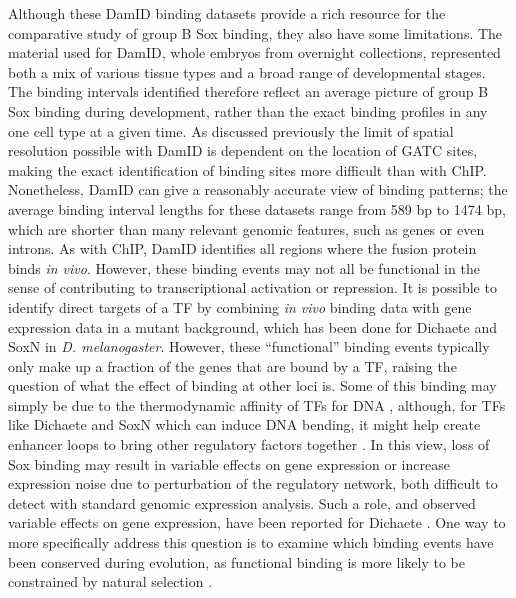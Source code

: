Although these DamID binding datasets provide a rich resource for the comparative study of group B Sox binding, they also have some limitations. The material used for DamID, whole embryos from overnight collections, represented both a mix of various tissue types and a broad range of developmental stages. The binding intervals identified therefore reflect an average picture of group B Sox binding during development, rather than the exact binding profiles in any one cell type at a given time. As discussed previously the limit of spatial resolution possible with DamID is dependent on the location of GATC sites, making the exact identification of binding sites more difficult than with ChIP. Nonetheless, DamID can give a reasonably accurate view of binding patterns; the average binding interval lengths for these datasets range from 589 bp to 1474 bp, which are shorter than many relevant genomic features, such as genes or even introns. As with ChIP, DamID identifies all regions where the fusion protein binds \emph{in vivo}. However, these binding events may not all be functional in the sense of contributing to transcriptional activation or repression. It is possible to identify direct targets of a TF by combining \emph{in vivo} binding data with gene expression data in a mutant background, which has been done for Dichaete and SoxN in \emph{D. melanogaster}. However, these “functional” binding events typically only make up a fraction of the genes that are bound by a TF, raising the question of what the effect of binding at other loci is. Some of this binding may simply be due to the thermodynamic affinity of TFs for DNA \citep{biggin_animal_2011,fisher_dna_2012,kaplan_quantitative_2011}, although, for TFs like Dichaete and SoxN which can induce DNA bending, it might help create enhancer loops to bring other regulatory factors together \citep{ghavi-helm_enhancer_2014}. In this view, loss of Sox binding may result in variable effects on gene expression or increase expression noise due to perturbation of the regulatory network, both difficult to detect with standard genomic expression analysis. Such a role, and observed variable effects on gene expression, have been reported for Dichaete \citep{russell_dichaete_1996}. One way to more specifically address this question is to examine which binding events have been conserved during evolution, as functional binding is more likely to be constrained by natural selection \citep{biggin_animal_2011}.\\

